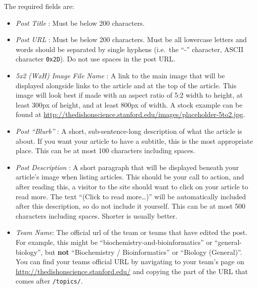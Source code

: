 \documentclass[paper=a4, fontsize=11pt]{scrartcl}
\numberwithin{equation}{section}        %
\numberwithin{figure}{section}            %
\numberwithin{table}{section}                %
\newcommand{\dishurlplain}[1]{http://thedishonscience.stanford.edu/#1}
\newcommand{\dishurl}[1]{\url{\dishurlplain{#1}}}
\begin{document}
\noindent{}The required fields are:\@
\begin{itemize}
    \item \emph{Post Title} : Must be below 200 characters.
    \item \emph{Post URL} : Must be below 200 characters.
        Must be all lowercase letters and words should be separated by single
        hyphens (i.e.\ the ``-'' character, ASCII character \texttt{0x2D}). Do
        not use spaces in the post URL.
    \item \emph{5x2 (WxH) Image File Name} : A link to the main image that will be
        displayed alongside links to the article and at the top of the article.
        This image will look best if made with an aspect ratio of 5:2 width to
        height, at least 300px of height, and at least 800px of width. A stock
        example can be found at \dishurl{images/placeholder-5to2.jpg}.
    \item \emph{Post ``Blurb''} : A short, sub-sentence-long description of what
        the article is about. If you want your article to have a subtitle, this
        is the most appropriate place. This can be at most 100 characters
        including spaces.
    \item \emph{Post Description} : A short paragraph that will be displayed
        beneath your article's image when listing articles. This should be your
        call to action, and after reading this, a visitor to the site should
        want to click on your article to read more. The text ``(Click to read
        more\ldots{})'' will be automatically included after this description, so do
        not include it yourself. This can be at most 500 characters including
        spaces. Shorter is usually better.
    \item \emph{Team Name}: The official url of the team or teams that have edited the
        post. For example, this might be ``biochemistry-and-bioinformatics'' or
        ``general-biology'', but \textbf{not} ``Biochemistry / Bioinformatics'' or
        ``Biology (General)''. You can find your teams official URL by navigating
        to your team's page on \url{\dishurlplain{}} and copying the part of the URL
        that comes after \texttt{/topics/}.
\end{itemize}
\end{document}
